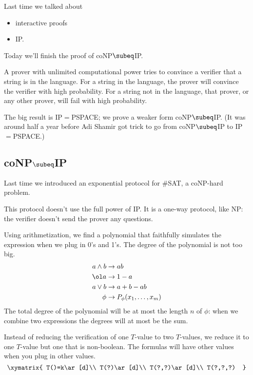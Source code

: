 
Last time we talked about
\begin{itemize}
\item
interactive proofs
\item
IP.
\end{itemize}
Today we'll finish the proof of coNP$\subeq$IP.

A prover with unlimited computational power tries to convince a verifier that a string is in the language. For a string in the language, the prover will convince the verifier with high probability. For a string not in the language, that prover, or any other prover, will fail with high probability.


The big result is IP$=$PSPACE; we prove a weaker form coNP$\subeq$IP. (It was around half a year before Adi Shamir got trick to go from coNP$\subeq$IP to IP$=$PSPACE.)

\subsection{coNP$\subeq$IP}

Last time we introduced an exponential protocol for \#SAT, a coNP-hard problem.

This protocol doesn't use the full power of IP. It is a one-way protocol, like NP: the verifier doesn't send the prover any questions.

Using arithmetization, we find a polynomial that faithfully simulates the expression when we plug in 0's and 1's. The degree of the polynomial is not too big. %
\begin{align*}
a\wedge b &\to ab\\
\ol a&\to 1-a\\
a\vee b &\to  a+b-ab\\
\phi &\to  P_{\phi}(x_1,\ldots, x_m)
\end{align*}
The total degree of the polynomial will be at most the length $n$ of $\phi$: when we combine two expressions the degrees will at most be the sum.

Instead of reducing the verification of one $T$-value to two $T$-values, we reduce it to one $T$-value but one that is non-boolean. 
The formulas will have other values when you plug in other values.
\[
\xymatrix{
T()=k\ar[d]\\
T(?)\ar[d]\\
T(?,?)\ar[d]\\
T(?,?,?)
}
\]

